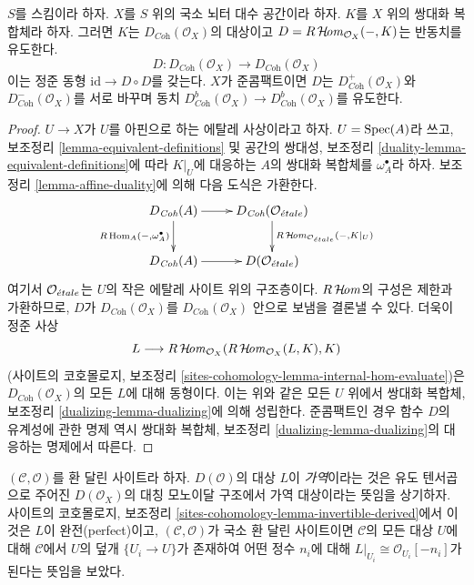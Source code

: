 \begin{lemma}
\label{lemma-dualizing-spaces}
$S$를 스킴이라 하자. $X$를 $S$ 위의 국소 뇌터 대수 공간이라 하자.
$K$를 $X$ 위의 쌍대화 복합체라 하자.
그러면 $K$는 $D_{\textit{Coh}}(\mathcal{O}_X)$의 대상이고
$D = R\mathop{\mathcal{H}\!\mathit{om}}\nolimits_{\mathcal{O}_X}(-, K)$는 반동치를 유도한다.
$$
D :
D_{\textit{Coh}}(\mathcal{O}_X)
\longrightarrow
D_{\textit{Coh}}(\mathcal{O}_X)
$$
이는 정준 동형 $\text{id} \to D \circ D$를 갖는다. $X$가 준콤팩트이면
$D$는 $D^+_{\textit{Coh}}(\mathcal{O}_X)$와
$D^-_{\textit{Coh}}(\mathcal{O}_X)$를 서로 바꾸며
동치
$D^b_{\textit{Coh}}(\mathcal{O}_X) \to D^b_{\textit{Coh}}(\mathcal{O}_X)$를
유도한다.
\end{lemma}

\begin{proof}
$U \to X$가 $U$를 아핀으로 하는 에탈레 사상이라고 하자.
$U = \mathop{\mathrm{Spec}}(A)$라 쓰고, 보조정리 \ref{lemma-equivalent-definitions} 및
공간의 쌍대성, 보조정리
\ref{duality-lemma-equivalent-definitions}에 따라 $K|_U$에 대응하는
$A$의 쌍대화 복합체를 $\omega_A^\bullet$라 하자.
보조정리 \ref{lemma-affine-duality}에 의해 다음 도식은 가환한다.
$$
\xymatrix{
D_{\textit{Coh}}(A) \ar[r] \ar[d]_{R\Hom_A(-, \omega_A^\bullet)} &
D_{\textit{Coh}}(\mathcal{O}_\etale)
\ar[d]^{R\SheafHom_{\mathcal{O}_\etale}(-, K|_U)} \\
D_{\textit{Coh}}(A) \ar[r] &
D(\mathcal{O}_\etale)
}
$$
여기서 $\mathcal{O}_{\acute{e}tale}$는 $U$의 작은 에탈레 사이트 위의
구조층이다. $R\mathop{\mathcal{H}\!\mathit{om}}\nolimits$의 구성은 제한과 가환하므로, $D$가
$D_{\textit{Coh}}(\mathcal{O}_X)$를
$D_{\textit{Coh}}(\mathcal{O}_X)$ 안으로 보냄을 결론낼 수 있다.
더욱이 정준 사상
$$
L \longrightarrow
R\mathop{\mathcal{H}\!\mathit{om}}\nolimits_{\mathcal{O}_X}(R\mathop{\mathcal{H}\!\mathit{om}}\nolimits_{\mathcal{O}_X}(L, K), K)
$$
(사이트의 코호몰로지, 보조정리
\ref{sites-cohomology-lemma-internal-hom-evaluate})은
$D_{\textit{Coh}}(\mathcal{O}_X)$의 모든 $L$에 대해 동형이다.
이는 위와 같은 모든 $U$ 위에서 쌍대화 복합체, 보조정리
\ref{dualizing-lemma-dualizing}에 의해 성립한다.
준콤팩트인 경우 함수 $D$의 유계성에 관한 명제 역시
쌍대화 복합체, 보조정리 \ref{dualizing-lemma-dualizing}의
대응하는 명제에서 따른다.
\end{proof}

\noindent
$(\mathcal{C}, \mathcal{O})$를 환 달린 사이트라 하자. $D(\mathcal{O})$의
대상 $L$이 {\it 가역}이라는 것은 유도 텐서곱으로 주어진
$D(\mathcal{O}_X)$의 대칭 모노이달 구조에서 가역 대상이라는 뜻임을
상기하자. 사이트의 코호몰로지, 보조정리
\ref{sites-cohomology-lemma-invertible-derived}에서 이것은 $L$이
완전(perfect)이고, $(\mathcal{C}, \mathcal{O})$가 국소 환 달린
사이트이면 $\mathcal{C}$의 모든 대상 $U$에 대해
$\mathcal{C}$에서 $U$의 덮개 $\{U_i \to U\}$가 존재하여
어떤 정수 $n_i$에 대해
$L|_{U_i} \cong \mathcal{O}_{U_i}[-n_i]$가 된다는 뜻임을 보았다.


